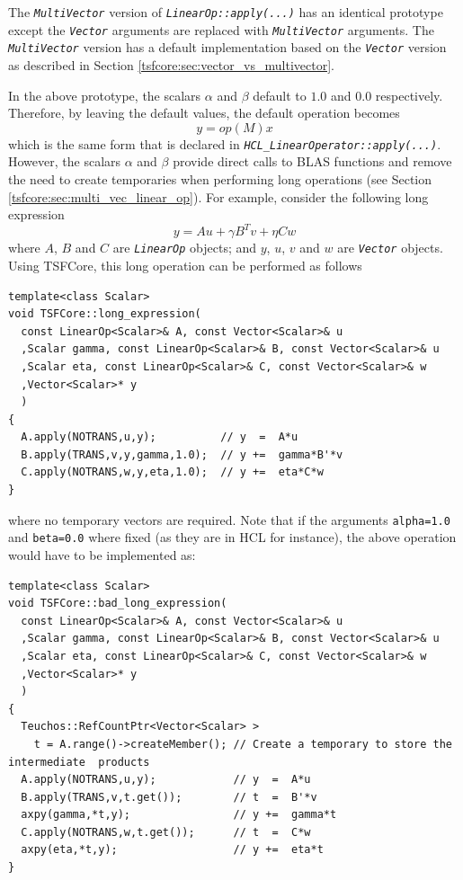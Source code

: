 The \texttt{\textit{Multi\-Vector}} version of
\texttt{\textit{LinearOp\-::apply(\-...)}} has an identical prototype
except the \texttt{\textit{Vector}} arguments are replaced with
\texttt{\textit{Multi\-Vector}} arguments.  The \texttt{\textit{Multi\-Vector}}
version has a default implementation based on the
\texttt{\textit{Vector}} version as described in Section
\ref{tsfcore:sec:vector_vs_multivector}.

In the above prototype, the scalars $\alpha$ and $\beta$ default to
$1.0$ and $0.0$ respectively.  Therefore, by leaving the default values,
the default operation becomes
%
\[
y = op(M) x
\]
%
which is the same form that is declared in
\texttt{\textit{HCL\-\_Linear\-Operator\-::apply(\-...)}}.  However, the scalars
$\alpha$ and $\beta$ provide direct calls to BLAS functions and remove
the need to create temporaries when performing long operations (see
Section \ref{tsfcore:sec:multi_vec_linear_op}).  For example, consider
the following long expression
%
\[
y = A u + \gamma B^T v + \eta C w
\]
%
where $A$, $B$ and $C$ are \texttt{\textit{LinearOp}} objects; and $y$,
$u$, $v$ and $w$ are \texttt{\textit{Vector}} objects.  Using TSFCore, this
long operation can be performed as follows

{\scriptsize\begin{verbatim}
template<class Scalar>
void TSFCore::long_expression(
  const LinearOp<Scalar>& A, const Vector<Scalar>& u
  ,Scalar gamma, const LinearOp<Scalar>& B, const Vector<Scalar>& u
  ,Scalar eta, const LinearOp<Scalar>& C, const Vector<Scalar>& w
  ,Vector<Scalar>* y
  )
{
  A.apply(NOTRANS,u,y);          // y  =  A*u
  B.apply(TRANS,v,y,gamma,1.0);  // y +=  gamma*B'*v
  C.apply(NOTRANS,w,y,eta,1.0);  // y +=  eta*C*w
}
\end{verbatim}}

{}\noindent{}where no temporary vectors are required.  Note that if the arguments
\texttt{alpha=1.0} and \texttt{beta=0.0} where fixed (as they are
in HCL for instance), the above operation would have to be implemented
as:

{\scriptsize\begin{verbatim}
template<class Scalar>
void TSFCore::bad_long_expression(
  const LinearOp<Scalar>& A, const Vector<Scalar>& u
  ,Scalar gamma, const LinearOp<Scalar>& B, const Vector<Scalar>& u
  ,Scalar eta, const LinearOp<Scalar>& C, const Vector<Scalar>& w
  ,Vector<Scalar>* y
  )
{
  Teuchos::RefCountPtr<Vector<Scalar> >
    t = A.range()->createMember(); // Create a temporary to store the intermediate  products
  A.apply(NOTRANS,u,y);            // y  =  A*u
  B.apply(TRANS,v,t.get());        // t  =  B'*v
  axpy(gamma,*t,y);                // y +=  gamma*t
  C.apply(NOTRANS,w,t.get());      // t  =  C*w
  axpy(eta,*t,y);                  // y +=  eta*t
}
\end{verbatim}}

